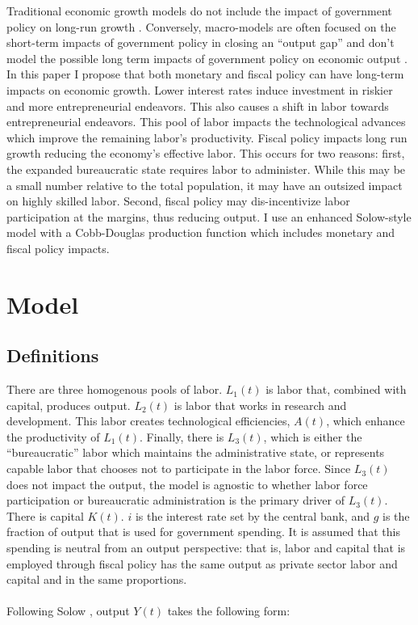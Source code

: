 \documentclass[12pt]{article}
\theoremstyle{definition}
\begin{document}
Traditional economic growth models do not include the impact of government policy on long-run growth \cite{solow}. Conversely, macro-models are often focused on the short-term impacts of government policy in closing an ``output gap'' and don't model the possible long term impacts of government policy on economic output \cite{mankiwreis}.  In this paper I propose that both monetary and fiscal policy can have long-term impacts on economic growth.  Lower interest rates induce investment in riskier and more entrepreneurial endeavors.  This also causes a shift in labor towards entrepreneurial endeavors.  This pool of labor impacts the technological advances which improve the remaining labor's productivity.  Fiscal policy impacts long run growth reducing the economy's effective labor.  This occurs for two reasons: first, the expanded bureaucratic state requires labor to administer.  While this may be a small number relative to the total population, it may have an outsized impact on highly skilled labor.  Second, fiscal policy may dis-incentivize labor participation at the margins, thus reducing output.  I use an enhanced Solow-style model with a Cobb-Douglas production function which includes monetary and fiscal policy impacts.

\section{Model}

\subsection{Definitions}
There are three homogenous pools of labor.  \(L_1(t)\) is labor that, combined with capital, produces output.  \(L_2(t)\) is labor that works in research and development.  This labor creates technological efficiencies, \(A(t)\), which enhance the productivity of \(L_1(t)\).  Finally, there is \(L_3(t)\), which is either the ``bureaucratic'' labor which maintains the administrative state, or represents capable labor that chooses not to participate in the labor force.  Since \(L_3(t)\) does not impact the output, the model is agnostic to whether labor force participation or bureaucratic administration is the primary driver of \(L_3(t)\).  There is capital \(K(t)\).  \(i\) is the interest rate set by the central bank, and \(g\) is the fraction of output that is used for government spending.  It is assumed that this spending is neutral from an output perspective: that is, labor and capital that is employed through fiscal policy has the same output as private sector labor and capital and in the same proportions.
\\
\\
Following Solow \cite{solow}, output \(Y(t)\) takes the following form:
\end{document}
